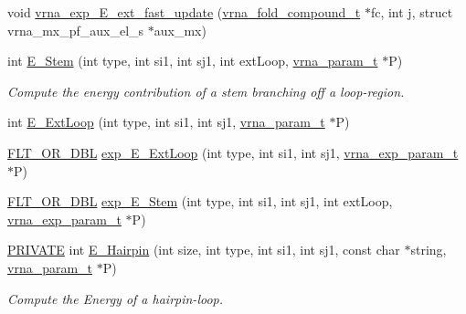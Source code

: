 \begin{DoxyCompactItemize}
void \mbox{\hyperlink{group__loops_gaceb115e3d8855129797620b3b26882d5}{vrna\+\_\+exp\+\_\+\+E\+\_\+ext\+\_\+fast\+\_\+update}} (\mbox{\hyperlink{group__fold__compound_ga1b0cef17fd40466cef5968eaeeff6166}{vrna\+\_\+fold\+\_\+compound\+\_\+t}} $\ast$fc, int j, struct vrna\+\_\+mx\+\_\+pf\+\_\+aux\+\_\+el\+\_\+s $\ast$aux\+\_\+mx)
\item 
int \mbox{\hyperlink{group__loops_ga51f9851f3500c2aae66674142a6a2dd5}{E\+\_\+\+Stem}} (int type, int si1, int sj1, int ext\+Loop, \mbox{\hyperlink{group__energy__parameters_ga8a69ca7d787e4fd6079914f5343a1f35}{vrna\+\_\+param\+\_\+t}} $\ast$P)
\begin{DoxyCompactList}\small\item\em Compute the energy contribution of a stem branching off a loop-\/region. \end{DoxyCompactList}\item 
int \mbox{\hyperlink{group__loops_ga05c6288c5a79d3bd5ad6d33c1bb34bd0}{E\+\_\+\+Ext\+Loop}} (int type, int si1, int sj1, \mbox{\hyperlink{group__energy__parameters_ga8a69ca7d787e4fd6079914f5343a1f35}{vrna\+\_\+param\+\_\+t}} $\ast$P)
\item 
\mbox{\hyperlink{group__data__structures_ga31125aeace516926bf7f251f759b6126}{F\+L\+T\+\_\+\+O\+R\+\_\+\+D\+BL}} \mbox{\hyperlink{group__loops_ga446828a191c127861e76e2c84055f672}{exp\+\_\+\+E\+\_\+\+Ext\+Loop}} (int type, int si1, int sj1, \mbox{\hyperlink{group__energy__parameters_ga01d8b92fe734df8d79a6169482c7d8d8}{vrna\+\_\+exp\+\_\+param\+\_\+t}} $\ast$P)
\item 
\mbox{\hyperlink{group__data__structures_ga31125aeace516926bf7f251f759b6126}{F\+L\+T\+\_\+\+O\+R\+\_\+\+D\+BL}} \mbox{\hyperlink{group__loops_gab0aa9833ab41875a91a9be8a5ffd7092}{exp\+\_\+\+E\+\_\+\+Stem}} (int type, int si1, int sj1, int ext\+Loop, \mbox{\hyperlink{group__energy__parameters_ga01d8b92fe734df8d79a6169482c7d8d8}{vrna\+\_\+exp\+\_\+param\+\_\+t}} $\ast$P)
\item 
\mbox{\hyperlink{group__utils_ga5e151c615eda34903514212f05a5ccf8}{P\+R\+I\+V\+A\+TE}} int \mbox{\hyperlink{group__loops_gadf943ee9a45b7f4cee9192c06210dace}{E\+\_\+\+Hairpin}} (int size, int type, int si1, int sj1, const char $\ast$string, \mbox{\hyperlink{group__energy__parameters_ga8a69ca7d787e4fd6079914f5343a1f35}{vrna\+\_\+param\+\_\+t}} $\ast$P)
\begin{DoxyCompactList}\small\item\em Compute the Energy of a hairpin-\/loop. \end{DoxyCompactList}\item 

\end{DoxyCompactItemize}
